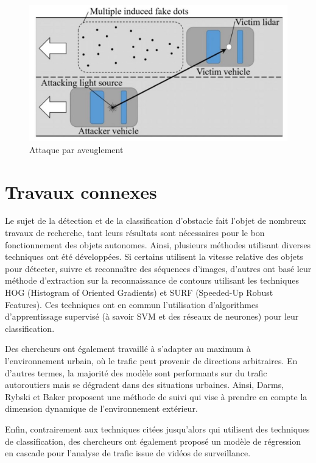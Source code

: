 \documentclass[a4paper]{report}
\begin{document}
\begin{figure}
\centering
\includegraphics[width=\textwidth]{img/blinding.png}
\caption{Attaque par aveuglement\label{blinding}}
\end{figure}

\section{Travaux connexes}

Le sujet de la détection et de la classification d'obstacle fait l'objet de nombreux travaux de recherche, tant leurs résultats sont nécessaires pour le bon fonctionnement des objets autonomes. Ainsi, plusieurs méthodes utilisant diverses techniques ont été développées. Si certains \cite{work1} utilisent la vitesse relative des objets pour détecter, suivre et reconnaître des séquences d'images, d'autres \cite{work2} ont basé leur méthode d'extraction sur la reconnaissance de contours utilisant les techniques HOG (Histogram of Oriented Gradients) et SURF (Speeded-Up Robust Features). Ces techniques ont en commun l'utilisation d'algorithmes d'apprentissage supervisé (à savoir SVM et des réseaux de neurones) pour leur classification.

Des chercheurs ont également travaillé à s'adapter au maximum à l'environnement urbain, où le trafic peut provenir de directions arbitraires. En d'autres termes, la majorité des modèle sont performants sur du trafic autoroutiers mais se dégradent dans des situations urbaines.  Ainsi, Darms, Rybski et Baker proposent \cite{work3} une méthode de suivi qui vise à prendre en compte la dimension dynamique de l'environnement extérieur.

Enfin, contrairement aux techniques citées jusqu'alors qui utilisent des techniques de classification, des chercheurs \cite{work4} ont également proposé un modèle de régression en cascade pour l'analyse de trafic issue de vidéos de surveillance.
\end{document}
